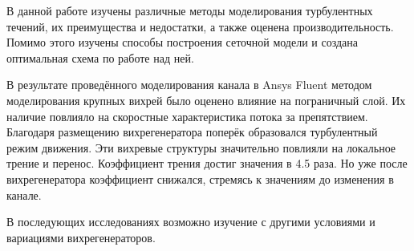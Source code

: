 
В данной работе изучены различные методы моделирования турбулентных течений, их преимущества и недостатки, а также оценена производительность. Помимо этого изучены способы построения сеточной модели и создана оптимальная схема по работе над ней.

В результате проведённого моделирования канала в Ansys Fluent методом моделирования крупных вихрей было оценено влияние на пограничный слой. Их наличие повлияло на скоростные характеристика потока за препятствием. Благодаря размещению вихрегенератора поперёк образовался турбулентный режим движения. Эти вихревые структуры значительно повлияли на локальное трение и перенос. Коэффициент трения достиг значения в 4.5 раза. Но уже после вихрегенератора коэффициент снижался, стремясь к значениям до изменения в канале.

В последующих исследованиях возможно изучение с другими условиями и вариациями вихрегенераторов.